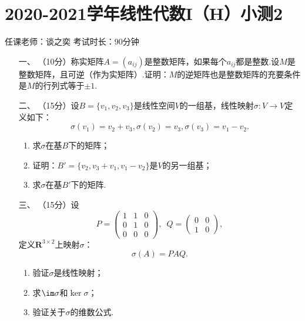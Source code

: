 \section*{2020-2021学年线性代数I（H）小测2}

\begin{center}
    任课老师：谈之奕\hspace{4em} 考试时长：90分钟
\end{center}

\begin{enumerate}
	\item[一、]（10分）称实矩阵$A=(a_{ij})$是整数矩阵，如果每个$a_{ij}$都是整数.设$M$是整数矩阵，且可逆（作为实矩阵）.证明：$M$的逆矩阵也是整数矩阵的充要条件是$M$的行列式等于$\pm 1$.
	\item[二、]（15分）设$B=\{v_1,v_2,v_3\}$是线性空间$V$的一组基，线性映射$\sigma:V\to V$定义如下：
	\[\sigma(v_1)=v_2+v_3,\sigma(v_2)=v_3,\sigma(v_3)=v_1-v_2.\]
    \begin{enumerate}[label=(\arabic*)]
        \item 求$\sigma$在基$B$下的矩阵；
        \item 证明：$B'=\{v_2,v_3+v_1,v_1-v_2\}$是$V$的另一组基；
        \item 求$\sigma$在基$B'$下的矩阵.
    \end{enumerate}
	\item[三、]（15分）设
	\[P=\begin{pmatrix}
        1 & 1 & 0 \\ 0 & 1 & 0 \\ 0 & 0 & 0
    \end{pmatrix},\enspace Q=\begin{pmatrix}
        0 & 0 \\ 1 & 0
    \end{pmatrix},\]
    定义$\mathbf{R}^{3\times 2}$上映射$\sigma$：
    \[\sigma(A)=PAQ.\]
    \begin{enumerate}[label=(\arabic*)]
        \item 验证$\sigma$是线性映射；
        \item 求$\im\sigma$和$\ker\sigma$；
        \item 验证关于$\sigma$的维数公式.
    \end{enumerate}

\end{enumerate}
